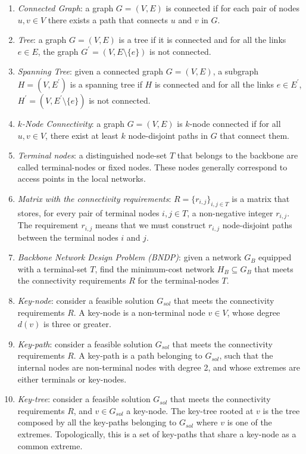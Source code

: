 \begin{enumerate}
\item \emph{Connected Graph}: a graph $G=(V,E)$ is connected if for each pair of nodes 
$u,v \in V$ there exists a path that connects $u$ and $v$ in $G$. 

\item \emph{Tree}: a graph $G=(V,E)$ is a tree if it is connected and for all the links $e\in E$, 
the graph $G^{\prime}=(V,E \setminus \{e\})$ is not connected.

\item \emph{Spanning Tree}: given a connected graph $G=(V,E)$, a subgraph $H=(V,E^{\prime})$ is a 
spanning tree if $H$ is connected and for all the links $e \in E^{\prime}$,   
$H^{\prime} = (V,E^{\prime} \setminus \{e\})$ is not connected. 

\item \emph{$k$-Node Connectivity}: a graph $G=(V,E)$ is $k$-node connected if for all $u,v \in V$, 
there exist at least $k$ node-disjoint paths in $G$ that connect them.

\item \emph{Terminal nodes}: a distinguished node-set $T$ that belongs to the backbone 
are called terminal-nodes or fixed nodes. These nodes generally correspond to access points in the local networks.

\item \emph{Matrix with the connectivity requirements}:  $R=\{r_{i,j}\}_{i,j\in T}$ 
is a matrix that stores, for every pair of terminal nodes $i,j \in T$, a non-negative integer $r_{i,j}$. 
The requirement $r_{i,j}$ means that we must construct $r_{i,j}$ node-disjoint paths 
between the terminal nodes $i$ and $j$.  

\item \emph{Backbone Network Design Problem (BNDP)}: given a network $G_B$ equipped with a terminal-set $T$, 
find the minimum-cost network $H_B \subseteq G_B$ 
that meets the connectivity requirements $R$ for the terminal-nodes $T$.

\item \emph{Key-node}: consider a feasible solution $G_{sol}$ that meets the connectivity requirements $R$. 
A key-node is a non-terminal node $v \in V$, whose degree $d(v)$ is three or greater. 

\item \emph{Key-path}: consider a feasible solution $G_{sol}$ that meets the connectivity requirements $R$.  
A  key-path is a path belonging to $G_{sol}$, such that the internal nodes are non-terminal nodes 
with degree 2, and whose extremes are either terminals or key-nodes.

\item \emph{Key-tree}: consider a feasible solution $G_{sol}$ that meets the connectivity requirements $R$, 
and $v \in G_{sol}$ a key-node. The key-tree rooted at $v$ is the tree composed by all the 
key-paths belonging to $G_{sol}$ where $v$ is one of the extremes. Topologically, this is a set of 
key-paths that share a key-node as a common extreme.
\end{enumerate}
